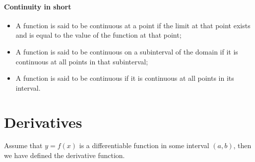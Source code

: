 \documentclass{article}
\begin{document}
\subsection{Continuity in short}
\begin{itemize}
    \item A function is said to be continuous at a point if the limit at that point exists and is equal to the value of the function at that point;
    \item A function is said to be continuous on a subinterval of the domain if it is continuous at all points in that subinterval;
    \item A function is said to be continuous if it is continuous at all points in its interval.
\end{itemize}

\newpage
\part{Derivatives}
Assume that $y=f(x)$ is a differentiable function in some interval $(a,b)$,
then we have defined the derivative function.
\end{document}
